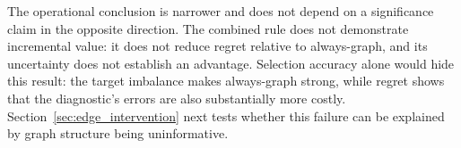 The operational conclusion is narrower and does not depend on a significance claim in the opposite direction. The combined rule does not demonstrate incremental value: it does not reduce regret relative to always-graph, and its uncertainty does not establish an advantage. Selection accuracy alone would hide this result: the target imbalance makes always-graph strong, while regret shows that the diagnostic's errors are also substantially more costly. Section~\ref{sec:edge_intervention} next tests whether this failure can be explained by graph structure being uninformative.
